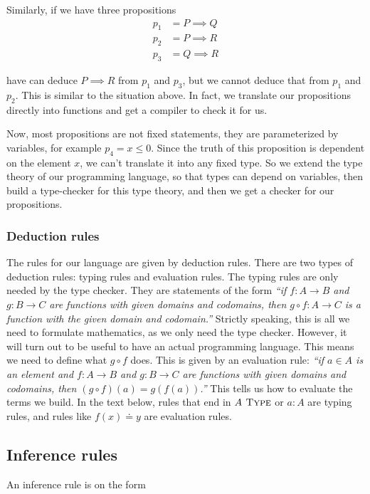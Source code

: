 \documentclass[a4paper, 12pt]{article}
\newcommand{\type}{\textsc{ Type}}
\theoremstyle{changedot}
\theoremstyle{changedotbreak}
\theoremstyle{nonumberplain}
\begin{document}
Similarly, if we have three propositions
\begin{align*}
  p_{1} &= P \implies Q \\
  p_{2} &= P \implies R \\
  p_{3} &= Q \implies R
\end{align*}

have can deduce $P \implies R$ from $p_{1}$ and $p_{3}$, but we cannot deduce that from $p_{1}$ and $p_{2}$. This is similar to the situation above. In fact, we translate our propositions directly into functions and get a compiler to check it for us.

Now, most propositions are not fixed statements, they are parameterized by variables, for example $p_{4} = x \le 0$. Since the truth of this proposition is dependent on the element $x$, we can't translate it into any fixed type. So we extend the type theory of our programming language, so that types can depend on variables, then build a type-checker for this type theory, and then we get a checker for our propositions.

\subsubsection{Deduction rules}

The rules for our language are given by deduction rules. There are two types of deduction rules: typing rules and evaluation rules. The typing rules are only needed by the type checker. They are statements of the form \textit{``if $f : A \to B$ and $g : B \to C$ are functions with given domains and codomains, then $g \circ f : A \to C$ is a function with the given domain and codomain.''} Strictly speaking, this is all we need to formulate mathematics, as we only need the type checker. However, it will turn out to be useful to have an actual programming language. This means we need to define what $g \circ f$ does. This is given by an evaluation rule: \textit{``if $a \in A$ is an element and $f : A \to B$ and $g : B \to C$ are functions with given domains and codomains, then $(g \circ f)(a) = g(f(a))$.''} This tells us how to evaluate the terms we build. In the text below, rules that end in $A \type$ or $a : A$ are typing rules, and rules like $f(x) \doteq y$ are evaluation rules.

\subsection{Inference rules}
An inference rule is on the form
\end{document}
